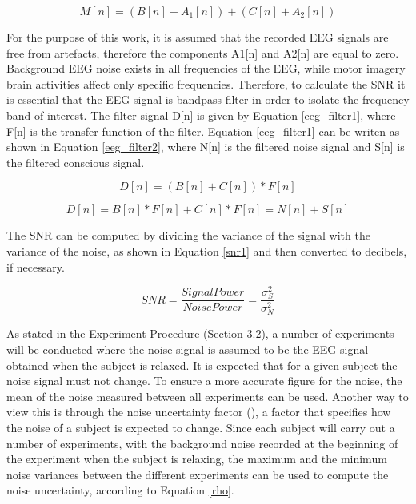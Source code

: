 \begin{equation}
M[n]=(B[n]+A_1 [n])+(C[n]+A_2 [n])
\label{eeg_signal2}
\end{equation}

For the purpose of this work, it is assumed that the recorded EEG signals are free from artefacts, therefore the components A1[n] and A2[n] are equal to zero.  Background EEG noise exists in all frequencies of the EEG, while motor imagery brain activities affect only specific frequencies. Therefore, to calculate the SNR it is essential that the EEG signal is bandpass filter in order to isolate the frequency band of interest. The filter signal D[n] is given by Equation \ref{eeg_filter1}, where F[n] is the transfer function of the filter. Equation  \ref{eeg_filter1} can be writen as shown in Equation  \ref{eeg_filter2}, where N[n] is the filtered noise signal and S[n] is the filtered conscious signal. 


\begin{equation}
D[n]=(B[n]+C[n])*F[n]
\label{eeg_filter1}
\end{equation}


\begin{equation}
D[n]=B[n]*F[n]+C[n]*F[n]=N[n]+S[n]
\label{eeg_filter2}
\end{equation}

The SNR can be computed by dividing the variance of the signal with the variance of the noise, as shown in Equation \ref{snr1} and then converted to decibels, if necessary. 


\begin{equation}
SNR = \frac{Signal Power}{Noise Power} = \frac{\sigma_{S}^2 }{\sigma_{N}^2 }
\label{snr1}
\end{equation}

As stated in the Experiment Procedure (Section 3.2), a number of experiments will be conducted where the noise signal is assumed to be the EEG signal obtained when the subject is relaxed. It is expected that for a given subject the noise signal must not change. To ensure a more accurate figure for the noise, the mean of the noise measured between all experiments can be used. Another way to view this is through the noise uncertainty factor (\textrho), a factor that specifies how the noise of a subject is expected to change. Since each subject will carry out a number of experiments, with the background noise recorded at the beginning of the experiment when the subject is relaxing, the maximum and the minimum noise variances between the different experiments can be used to compute the noise uncertainty, according to Equation \ref{rho}.

